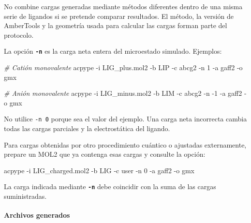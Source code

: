 \documentclass[
  spanish,
  11pt,
  a4paper]{article}
\newenvironment{Shaded}{\begin{snugshade}}{\end{snugshade}}
\newcommand{\AttributeTok}[1]{\textcolor[rgb]{0.13,0.29,0.53}{#1}}
\newcommand{\CommentTok}[1]{\textcolor[rgb]{0.56,0.35,0.01}{\textit{#1}}}
\newcommand{\ExtensionTok}[1]{#1}
\newcommand{\NormalTok}[1]{#1}
\begin{document}
No combine cargas generadas mediante métodos diferentes dentro de una
misma serie de ligandos si se pretende comparar resultados. El método,
la versión de AmberTools y la geometría usada para calcular las cargas
forman parte del protocolo.

La opción \textbf{\texttt{-n}} es la carga neta entera del microestado
simulado. Ejemplos:

\begin{Shaded}
\begin{Highlighting}[]
\CommentTok{\# Catión monovalente}
\ExtensionTok{acpype} \AttributeTok{{-}i}\NormalTok{ LIG\_plus.mol2 }\AttributeTok{{-}b}\NormalTok{ LIP }\AttributeTok{{-}c}\NormalTok{ abcg2 }\AttributeTok{{-}n}\NormalTok{ 1 }\AttributeTok{{-}a}\NormalTok{ gaff2 }\AttributeTok{{-}o}\NormalTok{ gmx}

\CommentTok{\# Anión monovalente}
\ExtensionTok{acpype} \AttributeTok{{-}i}\NormalTok{ LIG\_minus.mol2 }\AttributeTok{{-}b}\NormalTok{ LIM }\AttributeTok{{-}c}\NormalTok{ abcg2 }\AttributeTok{{-}n} \AttributeTok{{-}1} \AttributeTok{{-}a}\NormalTok{ gaff2 }\AttributeTok{{-}o}\NormalTok{ gmx}
\end{Highlighting}
\end{Shaded}

No utilice \texttt{-n\ 0} porque sea el valor del ejemplo. Una carga
neta incorrecta cambia todas las cargas parciales y la electrostática
del ligando.

Para cargas obtenidas por otro procedimiento cuántico o ajustadas
externamente, prepare un MOL2 que ya contenga esas cargas y consulte la
opción:

\begin{Shaded}
\begin{Highlighting}[]
\ExtensionTok{acpype} \AttributeTok{{-}i}\NormalTok{ LIG\_charged.mol2 }\AttributeTok{{-}b}\NormalTok{ LIG }\AttributeTok{{-}c}\NormalTok{ user }\AttributeTok{{-}n}\NormalTok{ 0 }\AttributeTok{{-}a}\NormalTok{ gaff2 }\AttributeTok{{-}o}\NormalTok{ gmx}
\end{Highlighting}
\end{Shaded}

La carga indicada mediante \textbf{\texttt{-n}} debe coincidir con la
suma de las cargas suministradas.

\paragraph{Archivos generados}\label{archivos-generados}
\end{document}
